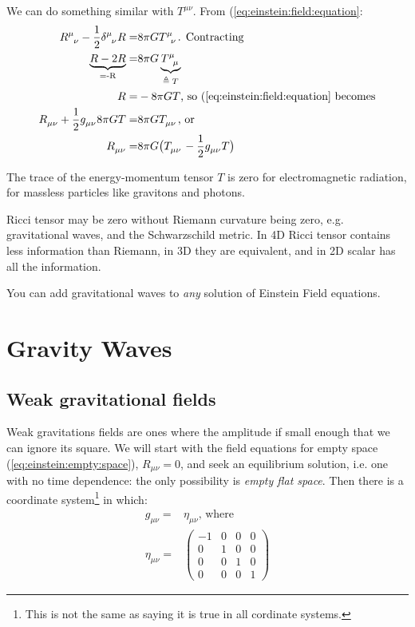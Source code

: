 \documentclass[]{article}
\begin{document}
{We can do something similar with $T^{\mu\nu}$. From (\ref{eq:einstein:field:equation}:
\begin{align*}
	R\indices{^\mu_\nu} - \frac{1}{2} \delta\indices{^\mu_\nu} R =& 8 \pi G T\indices{^\mu_\nu} \text{. Contracting}\\
	\underbrace{R - 2 R}_\text{=-R} =& 8 \pi G \underbrace{T\indices{^\mu_\mu}}_\text{$\triangleq T$} \\
	R =& -8 \pi G T \text{, so (\ref{eq:einstein:field:equation} becomes}\\
	R\indices{_{\mu\nu}} + \frac{1}{2} g\indices{_{\mu\nu}} 8 \pi G T =& 8 \pi G T\indices{_{\mu\nu}} \text{, or}\\
	R\indices{_{\mu\nu}}  =& 8 \pi G \big(T\indices{_{\mu\nu}} - \frac{1}{2} g\indices{_{\mu\nu}}  T\big)
\end{align*}

The trace of the energy-momentum tensor $T$ is zero for electromagnetic radiation, for massless particles like gravitons and photons.

Ricci tensor may be zero without Riemann curvature being zero, e.g. gravitational waves, and the Schwarzschild metric. In 4D Ricci tensor contains less information than Riemann, in 3D they are equivalent, and in 2D scalar has all the information. 

You can add gravitational waves to \emph{any} solution of Einstein Field equations.


\section{Gravity Waves}

\subsection{Weak gravitational fields}

Weak gravitations fields are ones where the amplitude if small enough that we can ignore its square.  We will start with the field equations for empty space (\ref{eq:einstein:empty:space}), $R_{\mu\nu}=0$, and seek an equilibrium solution, i.e. one with no time dependence: the only possibility is \emph{empty flat space}. Then there is a coordinate system\footnote{This is not the same as saying it is true in all cordinate systems.} in which:
\begin{align*}
	g_{\mu\nu} =& \eta_{\mu\nu} \text{, where}\\
	\eta_{\mu\nu} =& \begin{pmatrix}
						-1 &0&0&0  \\
						0&1&0&0    \\
						0&0&1&0    \\
						0&0&0&1
					\end{pmatrix}
\end{align*}

}
\end{document}
